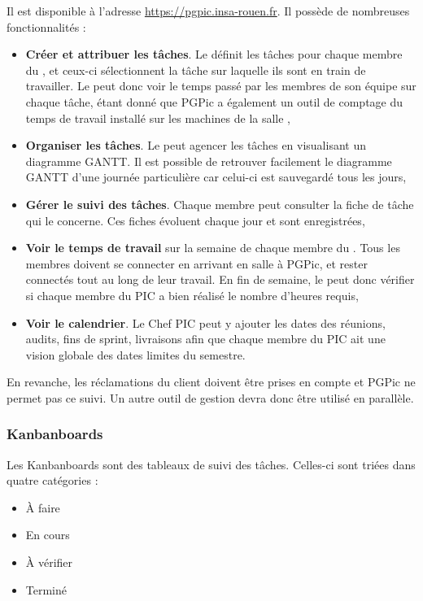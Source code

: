 Il est disponible à l’adresse \url{https://pgpic.insa-rouen.fr}. Il possède de nombreuses fonctionnalités : 
\begin{itemize}
\item \textbf{Créer et attribuer les tâches}. Le \CP{} définit les tâches pour chaque membre du \PICCourt, et ceux-ci sélectionnent la tâche sur laquelle ils sont en train de travailler. Le \CP{} peut donc voir le temps passé par les membres de son équipe sur chaque tâche, étant donné que PGPic a également un outil de comptage du temps de travail installé sur les machines de la salle \PICCourt ,
\item \textbf{Organiser les tâches}. Le \CP{} peut agencer les tâches en visualisant un diagramme GANTT. Il est possible de retrouver facilement le diagramme GANTT d'une journée particulière car celui-ci est sauvegardé tous les jours, 
\item \textbf{Gérer le suivi des tâches}. Chaque membre peut consulter la fiche de tâche qui le concerne. Ces fiches évoluent chaque jour et sont enregistrées,
\item \textbf{Voir le temps de travail} sur la semaine de chaque membre du \PICCourt. Tous les membres doivent se connecter en arrivant en salle \PICCourt à PGPic, et rester connectés tout au long de leur travail. En fin de semaine, le \CP{} peut donc vérifier si chaque membre du PIC a bien réalisé le nombre d’heures requis,
\item \textbf{Voir le calendrier}. Le Chef PIC peut y ajouter les dates des réunions, audits, fins de sprint, livraisons afin que chaque membre du PIC ait une vision globale des dates limites du semestre. \\ 
\end{itemize}

En revanche, les réclamations du client doivent être prises en compte et PGPic ne permet pas ce suivi. Un autre outil de gestion devra donc être utilisé en parallèle. 


\subsubsection*{Kanbanboards} 

Les Kanbanboards sont des tableaux de suivi des tâches. Celles-ci sont triées dans quatre catégories :
\begin{itemize}
\item \`A faire
\item En cours
\item \`A vérifier
\item Terminé \\ 
\end{itemize}

